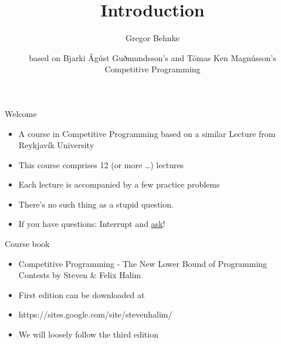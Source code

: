 \documentclass[12pt,t]{beamer}
\title{Introduction}
\author{Gregor Behnke}
\institute{Institute of Artificial Intelligence\\ Ulm University}
\date{\tiny based on Bjarki Ágúst Guðmundsson's and Tómas Ken Magnússon's\\Competitive Programming}
\newcommand{\bi}{\begin{itemize}}
\newcommand{\ei}{\end{itemize}}
\begin{document}
{
    \frame{
        \titlepage
    }
}


\begin{frame}{Welcome}

    \vspace{40pt}

    \bi
        \item A course in Competitive Programming based on a similar Lecture from Reykjavík University

        \vspace{10pt}
        \item This course comprises 12 (or more \dots) lectures
        \vspace{10pt}

        \item Each lecture is accompanied by a few practice problems
        
        \pause
        \item {\color{hilight}There's no such thing as a stupid question.}
        \item If you have questions: Interrupt and \underline{ask}!
    \ei
\end{frame}

\begin{frame}{Course book}
    \vspace{20pt}

    \bi
        \item {\color{hilight}Competitive Programming - The New Lower Bound of Programming Contests} by Steven \& Felix Halim
        \item First edition can be downloaded at
        \item {\color{vhilight}https://sites.google.com/site/stevenhalim/}
        \vspace{20pt}
        \item We will loosely follow the third edition
    \ei
\end{frame}
\end{document}
